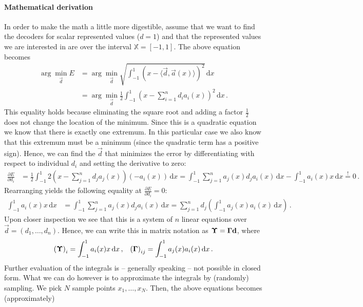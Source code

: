 \documentclass[10pt,letterpaper,oneside]{article}
\begin{document}
\paragraph{Mathematical derivation} In order to make the math a little more digestible, assume that we want to find the decoders for scalar represented values ($d = 1$) and that the represented values we are interested in are over the interval $\mathbb{X} = [-1, 1]$. The above equation becomes
\begin{align}
	\arg\min_{\vec d} E
		&= \arg\min_{\vec d} \sqrt{ \int_{-1}^1 \left(x - \langle \vec d, \vec a(x) \rangle\right)^2 } \,\mathrm{d}x \\
		&= \arg\min_{\vec d} \frac{1}2 \int_{-1}^1 \left(x - \sum_{i = 1}^n d_i a_i(x) \right)^2 \,\mathrm{d}x \,.
	\label{eqn:decoder_loss}
\end{align}
This equality holds because eliminating the square root and adding a factor $\frac{1}2$ does not change the location of the minimum. Since this is a quadratic equation we know that there is exactly one extremum. In this particular case we also know that this extremum must be a minimum (since the quadratic term has a positive sign). Hence, we can find the $\vec d$ that minimizes the error by differentiating with respect to individual $d_i$ and setting the derivative to zero:
\begin{align*}
	\frac{\partial E}{\partial d_i}
		&= \frac{1}2 \int_{-1}^1 2 \left(x - \sum_{j = 1}^n d_j a_j(x) \right) \left(-a_i(x) \right) \,\mathrm{d}x
		 = \int_{-1}^1 \sum_{j = 1}^n a_j(x) d_j a_i(x) \,\mathrm{d}x - \int_{-1}^1 a_i(x) x \,\mathrm{d}x
		\overset{!}= 0 \,.
\end{align*}
Rearranging yields the following equality at $\frac{\partial E}{\partial d_i} = 0$:
\begin{align*}
	\int_{-1}^1 a_i(x) x \,\mathrm{d}x
		&= \int_{-1}^1 \sum_{j = 1}^n a_j(x) d_j a_i(x) \,\mathrm{d}x
		 = \sum_{j = 1}^n d_j \left( \int_{-1}^1 a_j(x) a_i(x) \,\mathrm{d}x \right) \,.
\end{align*}
Upon closer inspection we see that this is a system of $n$ linear equations over $\vec d = (d_1, \ldots, d_n)$. Hence, we can write this in matrix notation as ${\mathbf{\Upsilon}} = {\mathbf{\Gamma}} {\mathbf{d}}$, where
\begin{align*}
	\left( {\mathbf{\Upsilon}} \right)_i
		&= \int_{-1}^1 a_i(x) x \,\mathrm{d}x \,, &
	\left( {\mathbf{\Gamma}} \right)_{ij}
		 = \int_{-1}^1 a_j(x) a_i(x) \,\mathrm{d}x \,.
\end{align*}
Further evaluation of the integrals is -- generally speaking -- not possible in closed form. What we can do however is to approximate the integrals by (randomly) sampling. We pick $N$ sample points $x_1, \ldots, x_N$. Then, the above equations becomes (approximately)
\end{document}
